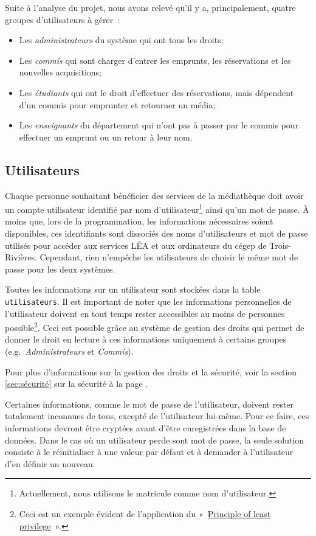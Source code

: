 \documentclass[letter, 11pt]{report}
\begin{document}
Suite à l'analyse du projet, nous avons relevé qu'il y a, principalement, quatre groupes d'utilisateurs à gérer~:
\begin{itemize}
	\item Les \emph{administrateurs} du système qui ont tous les droits;
	\item Les \emph{commis} qui sont charger d'entrer les emprunts, les réservations et les nouvelles acquisitions;
	\item Les \emph{étudiants} qui ont le droit d'effectuer des réservations, mais dépendent d'un commis pour emprunter et retourner un média;
	\item Les \emph{enseignants} du département qui n'ont pas à passer par le commis pour effectuer un emprunt ou un retour à leur nom.
\end{itemize}

\subsection{Utilisateurs}
Chaque personne souhaitant bénéficier des services de la médiathèque doit avoir un compte utilisateur identifié par nom d'utilisateur\footnote{Actuellement, nous utilisons le matricule comme nom d'utilisateur.} ainsi qu'un mot de passe. À moins que, lors de la programmation, les informations nécessaires soient disponibles, ces identifiants sont dissociés des noms d'utilisateurs et mot de passe utilisés pour accéder aux services LÉA et aux ordinateurs du cégep de Trois-Rivières. Cependant, rien n'empêche les utilisateurs de choisir le même mot de passe pour les deux systèmes.

Toutes les informations sur un utilisateur sont stockées dans la table \texttt{utilisateurs}. Il est important de noter que les informations personnelles de l'utilisateur doivent en tout temps rester accessibles au moins de personnes possible\footnote{Ceci est un exemple évident de l'application du «~\href{http://en.wikipedia.org/wiki/Principle_of_least_privilege}{Principle of least privilege}~».}. Ceci est possible grâce au système de gestion des droits qui permet de donner le droit en lecture à ces informations uniquement à certains groupes (e.g.\ \emph{Administrateurs} et \emph{Commis}).

Pour plus d'informations sur la gestion des droits et la sécurité, voir la section \ref{sec:sécurité} sur la sécurité à la page \pageref{sec:sécurité}.

Certaines informations, comme le mot de passe de l'utilisateur, doivent rester totalement inconnues de tous, excepté de l'utilisateur lui-même. Pour ce faire, ces informations devront être cryptées avant d'être enregistrées dans la base de données. Dans le cas où un utilisateur perde sont mot de passe, la seule solution consiste à le réinitialiser à une valeur par défaut et à demander à l'utilisateur d'en définir un nouveau.
\end{document}
